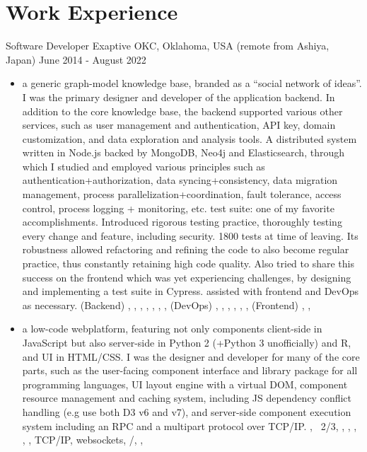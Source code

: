 \section{Work Experience}

\cventry
  {Software Developer} %
  {Exaptive} %
  {OKC, Oklahoma, USA (remote from Ashiya, Japan)} %
  {June 2014 - August 2022} %
  {
    \begin{itemize} %
      \liststyle
      \item { a generic graph-model knowledge base, branded as a ``social network of ideas''.
        I was the primary designer and developer of the application backend.
        In addition to the core knowledge base, the backend supported various other services, 
        such as user management and authentication, API key, domain customization, and data exploration and analysis tools.
        A distributed system written in Node.js backed by MongoDB, Neo4j and Elasticsearch, through which I studied and employed various principles such as 
        authentication+authorization, 
        data syncing+consistency, 
        data migration management,
        process parallelization+coordination, 
        fault tolerance, 
        access control, 
        process logging + monitoring, 
        etc.
        \tgsubitem test suite: one of my favorite accomplishments. Introduced rigorous testing practice, thoroughly testing every change and feature, including security. 
        1800 tests at time of leaving. 
        Its robustness allowed refactoring and refining the code to also become regular practice, thus constantly retaining high code quality. 
        Also tried to share this success on the frontend which was yet experiencing challenges, by designing and implementing a test suite in Cypress.
        \tgsubitem assisted with frontend and DevOps as necessary. 
        \tgskills (Backend) \rfnodejs, \rfmongodb, \rfneofj, \rfredis, \rfelastic, \rfbash, \rfdocker, 
        (DevOps) \rfjenkins, \rfaws, \rfansible, \rfterraform, \rfnewrelic, \rfsumologic,
        (Frontend) \rftypescript, \rfreact, \rfcypress
      }

      \item {
         a low-code webplatform, featuring not only components client-side in JavaScript but also server-side in Python 2 (+Python 3 unofficially) and R, and UI in HTML/CSS.
        I was the designer and developer for many of the core parts, such as 
        the user-facing component interface and library package for all programming languages, 
        UI layout engine with a virtual DOM,
        component resource management and caching system, including JS dependency conflict handling (e.g use both D3 v6 and v7),
        and 
        server-side component execution system including an RPC and a multipart protocol over TCP/IP.
        \tgskills  \rfjavascript, \rfpython\ 2/3, \rfclang, \rfphp, \rfmysql, \rfredis, \rfdocker, TCP/IP, websockets, \rfhtml/\rfcss, \rfaws, \rfdthree
      }
    \end{itemize}
  }


